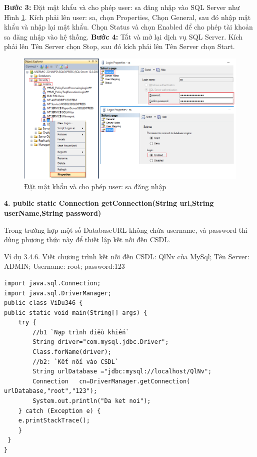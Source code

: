 \textbf{Bước 3:} Đặt mật khẩu và cho phép user: sa đăng nhập vào SQL Server như Hình  \ref{hinh33_9}. Kích phải lên user: sa, chọn Properties, Chọn General, sau đó nhập mật khẩu và nhập lại mật khẩu. Chọn Status và chọn Enabled để cho phép tài khoản sa đăng nhập vào hệ thống.  
\textbf{Bước 4:} Tắt và mở lại dịch vụ SQL Server. Kích phải lên Tên Server chọn Stop, sau đó  kích phải lên Tên Server chọn Start.
\begin{figure}[!ht]
	\centering
	\includegraphics[scale=0.5]{Figures//Hinh33_9.png}
	\caption{Đặt mật khẩu và cho phép user: sa đăng nhập  }\label{hinh33_9} 
\end{figure}

\textbf{4. public static Connection getConnection(String url,String userName,String password)}

Trong trường hợp một số DatabaseURL không chứa username, và password thì dùng phương thức này để thiết lập kết nối đến CSDL.

Ví dụ 3.4.6. Viết chương trình kết nối đến CSDL: QlNv của MySql; Tên Server: ADMIN; Username: root; password:123
\begin{lstlisting}[escapechar=`]
import java.sql.Connection;
import java.sql.DriverManager;
public class ViDu346 {
public static void main(String[] args) {
	try {
		//b1 `Nạp trình điều khiển`
		String driver="com.mysql.jdbc.Driver";
		Class.forName(driver);
		//b2: `Kết nối vào CSDL`
		String urlDatabase ="jdbc:mysql://localhost/QlNv";
		Connection   cn=DriverManager.getConnection( urlDatabase,"root","123");
		System.out.println("Da ket noi");
	} catch (Exception e) {
	e.printStackTrace();
	}
 }
}
\end{lstlisting}

